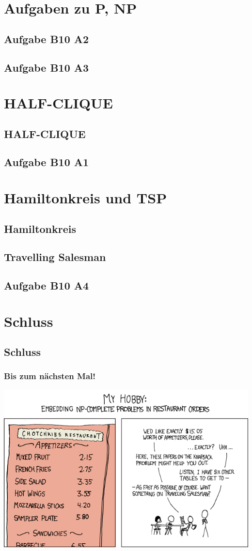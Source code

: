 \section{Aufgaben zu P, NP}
\subsection{Aufgabe B10 A2}
\subsection{Aufgabe B10 A3}

\section{HALF-CLIQUE}
\subsection{HALF-CLIQUE}
\subsection{Aufgabe B10 A1}

\section{Hamiltonkreis und TSP}
\subsection{Hamiltonkreis}
\subsection{Travelling Salesman}
\subsection{Aufgabe B10 A4}

\section{Schluss}
\subsection{Schluss}
\begin{frame}
\frametitle{Bis zum nächsten Mal!}
\begin{center}
	\includegraphics[scale=5.2]{images/287_np_complete.png}
\end{center}
\end{frame}

